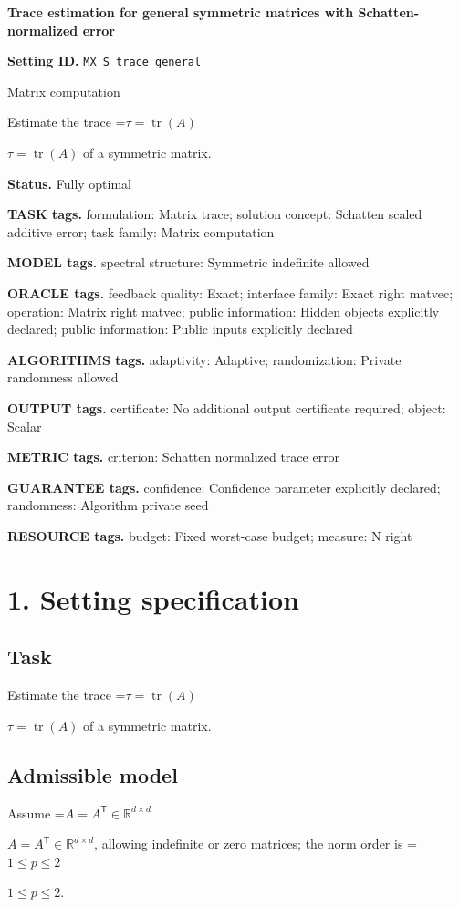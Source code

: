 \documentclass[10pt,a4paper]{article}
\newcommand{\AtlasMath}[1]{\par\begingroup\centering\setbox0=\hbox{$\displaystyle #1$}\ifdim\wd0>1.4\linewidth\typeout{ATLAS WIDE FORMULA: \the\wd0}\fi\ifdim\wd0>\linewidth\resizebox{\linewidth}{!}{\box0}\else\box0\fi\par\endgroup}
\newcommand{\AtlasInlineMath}[1]{\begingroup\setbox0=\hbox{$#1$}\ifdim\wd0>.4\linewidth\endgroup\AtlasMath{#1}\else\endgroup$#1$\fi}
\begin{document}
\raggedright

{\LARGE\bfseries\sffamily\color{AtlasNavy} Trace estimation for general symmetric matrices with Schatten-normalized error\par}\vspace{5pt}
\textbf{Setting ID.} \texttt{MX\_\allowbreak{}S\_\allowbreak{}trace\_\allowbreak{}general}

Matrix computation

Estimate the trace \AtlasInlineMath{\tau=\operatorname{tr}(A)} of a symmetric matrix.

\textbf{Status.} Fully optimal

\textbf{TASK tags.} formulation: Matrix trace; solution concept: Schatten scaled additive error; task family: Matrix computation

\textbf{MODEL tags.} spectral structure: Symmetric indefinite allowed

\textbf{ORACLE tags.} feedback quality: Exact; interface family: Exact right matvec; operation: Matrix right matvec; public information: Hidden objects explicitly declared; public information: Public inputs explicitly declared

\textbf{ALGORITHMS tags.} adaptivity: Adaptive; randomization: Private randomness allowed

\textbf{OUTPUT tags.} certificate: No additional output certificate required; object: Scalar

\textbf{METRIC tags.} criterion: Schatten normalized trace error

\textbf{GUARANTEE tags.} confidence: Confidence parameter explicitly declared; randomness: Algorithm private seed

\textbf{RESOURCE tags.} budget: Fixed worst-case budget; measure: N right

\section{1. Setting specification}
\subsection{Task}
Estimate the trace \AtlasInlineMath{\tau=\operatorname{tr}(A)} of a symmetric matrix.

\subsection{Admissible model}
Assume \AtlasInlineMath{A=A^{\mathsf T}\in\mathbb{R}^{d\times d}}, allowing indefinite or zero matrices; the norm order is \AtlasInlineMath{1\le p\le2}.
\end{document}
